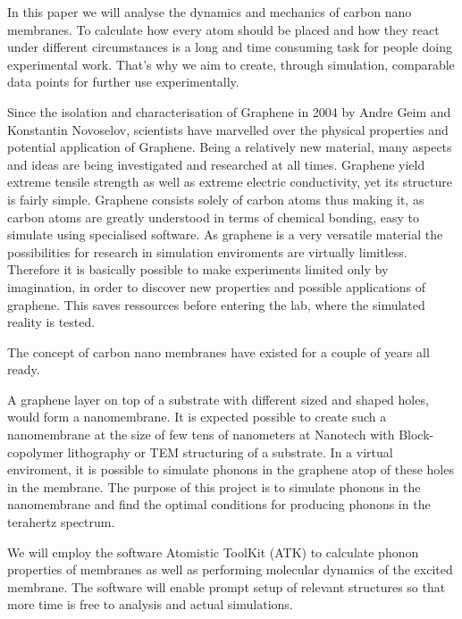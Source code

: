 
In this paper we will analyse the dynamics and mechanics of carbon nano membranes. To calculate how every atom should be placed and how they react under different circumstances is a long and time consuming task for people doing experimental work. That's why we aim to create, through simulation, comparable data points for further use experimentally.

Since the isolation and characterisation of
Graphene in 2004 by Andre Geim and
Konstantin Novoselov, scientists have marvelled over the physical properties and potential
application of Graphene. Being a relatively new material, many aspects and ideas are being
investigated and researched at all times. Graphene yield extreme tensile strength as well as
extreme electric conductivity, yet its structure is fairly simple. Graphene consists solely of
carbon atoms thus making it, as carbon atoms are greatly understood in terms of chemical
bonding, easy to simulate using specialised software. As graphene is a very versatile
material the possibilities for research in simulation enviroments are virtually limitless.
Therefore it is basically possible to make experiments limited only by imagination, in order
to discover new properties and possible applications of graphene. This saves ressources
before entering the lab, where the simulated reality is tested.

The concept of carbon nano membranes have existed for a couple of years all ready. 

A graphene layer on top of a substrate with different sized and shaped holes, would
form a nanomembrane. It is expected possible to create such a nanomembrane at the
size of few tens of nanometers at Nanotech with Block-copolymer lithography or TEM
structuring of a substrate. In a virtual enviroment, it is possible to simulate phonons
in the graphene atop of these holes in the membrane. The purpose of this project is to
simulate phonons in the nanomembrane and find the optimal conditions for producing
phonons in the terahertz spectrum.

We will employ the software Atomistic ToolKit (ATK) to calculate phonon properties
of membranes as well as performing molecular dynamics of the excited membrane. The
software will enable prompt setup of relevant structures so that more time is free to analysis
and actual simulations.
